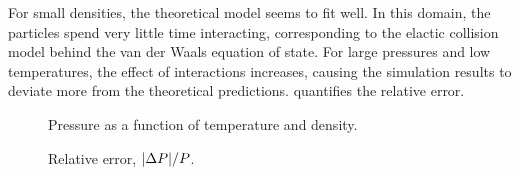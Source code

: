 \documentclass[11pt,british,a4paper]{report}
\begin{document}
For small densities, the theoretical model seems to fit well.
In this domain, the particles spend very little time interacting, corresponding to the elactic collision model behind the van der Waals equation of state. For large pressures and low temperatures, the effect of interactions increases, causing the simulation results to deviate more from the theoretical predictions.
 quantifies the relative error.



\begin{figure}[htbp]
    \centering
    \caption{Pressure as a function of temperature and density.}\label{fig:vanderWaals}
\end{figure}
\begin{figure}[htbp]
    \centering
    \caption{Relative error, \(\abs{\Delta P}/P\).}\label{fig:Perror}
\end{figure}
\end{document}
